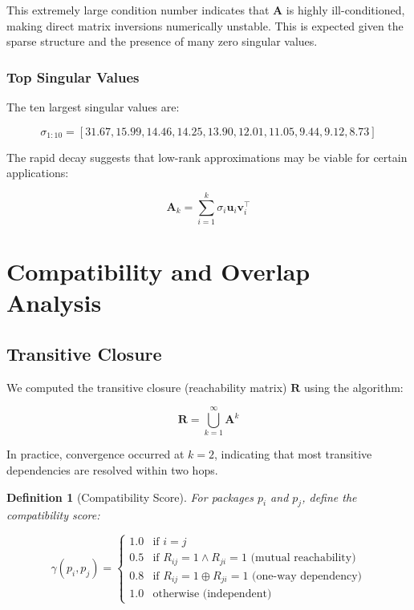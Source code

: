 \documentclass[11pt,a4paper]{article}
\newtheorem{definition}{Definition}
\begin{document}
This extremely large condition number indicates that $\mathbf{A}$ is highly ill-conditioned, making direct matrix inversions numerically unstable. This is expected given the sparse structure and the presence of many zero singular values.

\subsubsection{Top Singular Values}

The ten largest singular values are:

\begin{equation}
\sigma_{1:10} = [31.67, 15.99, 14.46, 14.25, 13.90, 12.01, 11.05, 9.44, 9.12, 8.73]
\end{equation}

The rapid decay suggests that low-rank approximations may be viable for certain applications:

\begin{equation}
\mathbf{A}_k = \sum_{i=1}^k \sigma_i \mathbf{u}_i \mathbf{v}_i^\top
\end{equation}

\section{Compatibility and Overlap Analysis}

\subsection{Transitive Closure}

We computed the transitive closure (reachability matrix) $\mathbf{R}$ using the algorithm:

\begin{equation}
\mathbf{R} = \bigcup_{k=1}^\infty \mathbf{A}^k
\end{equation}

In practice, convergence occurred at $k = 2$, indicating that most transitive dependencies are resolved within two hops.

\begin{definition}[Compatibility Score]
For packages $p_i$ and $p_j$, define the compatibility score:

\begin{equation}
\gamma(p_i, p_j) = \begin{cases}
1.0 & \text{if } i = j \\
0.5 & \text{if } R_{ij} = 1 \land R_{ji} = 1 \text{ (mutual reachability)} \\
0.8 & \text{if } R_{ij} = 1 \oplus R_{ji} = 1 \text{ (one-way dependency)} \\
1.0 & \text{otherwise (independent)}
\end{cases}
\end{equation}
\end{definition}
\end{document}
